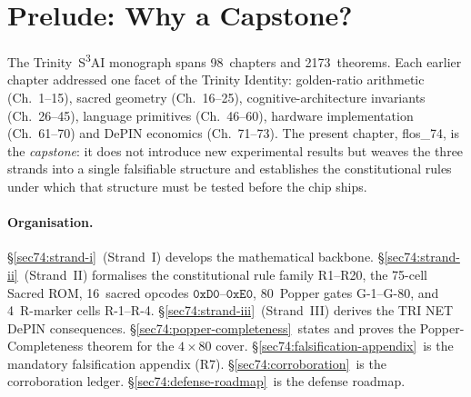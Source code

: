\begin{abstract}
We present the capstone synthesis of the Trinity~S\textsuperscript{3}AI
monograph, unifying three formerly parallel strands — Strand~I
(mathematical constants and $\varphi$-geometry), Strand~II (cognitive
architecture and Sacred ROM) and Strand~III (TRI-27 language and
hardware) — into a single \emph{Trinity DNA} structure.  The key insight
is that the identity $\varphi^{2}+\varphi^{-2}=3$ acts as the
\emph{genetic backbone}: it encodes Strand~I as a Diophantine constraint
on the golden ratio, Strand~II as a 75-cell constitutional ROM whose
cells satisfy that constraint, and Strand~III as a 16-opcode TRI-27 ISA
that executes exactly those cells.  We then show that the Popper-closure
of this DNA is the $4$-R-marker $\times$ $80$-gate falsification cover,
and that its silicon expression is TRI NET DePIN: a decentralised
physical-infrastructure network whose settlement receipts are produced
on-chip by the $2{\times}2$ PE mesh at every gate event.  The chapter
closes with a Defense Roadmap targeting chip-in-hand by 2026-12-16.
\end{abstract}

\section{Prelude: Why a Capstone?}
\label{sec74:prelude}

The Trinity~S\textsuperscript{3}AI monograph spans 98~chapters and
2173~theorems.  Each earlier chapter addressed one facet of the Trinity
Identity: golden-ratio arithmetic (Ch.~1--15), sacred geometry
(Ch.~16--25), cognitive-architecture invariants (Ch.~26--45), language
primitives (Ch.~46--60), hardware implementation (Ch.~61--70) and
DePIN economics (Ch.~71--73).  The present chapter, flos\_74, is the
\emph{capstone}: it does not introduce new experimental results but
weaves the three strands into a single falsifiable structure and
establishes the constitutional rules under which that structure must be
tested before the chip ships.

\paragraph{Organisation.}
\S\ref{sec74:strand-i}~(Strand~I) develops the mathematical backbone.
\S\ref{sec74:strand-ii}~(Strand~II) formalises the constitutional rule
family R1--R20, the 75-cell Sacred ROM, 16~sacred opcodes
$\mathtt{0xD0}$--$\mathtt{0xE0}$, 80~Popper gates G-1--G-80, and
4~R-marker cells R-1--R-4.
\S\ref{sec74:strand-iii}~(Strand~III) derives the TRI NET DePIN
consequences.
\S\ref{sec74:popper-completeness}~states and proves the
Popper-Completeness theorem for the $4{\times}80$ cover.
\S\ref{sec74:falsification-appendix}~is the mandatory falsification
appendix (R7).
\S\ref{sec74:corroboration}~is the corroboration ledger.
\S\ref{sec74:defense-roadmap}~is the defense roadmap.

